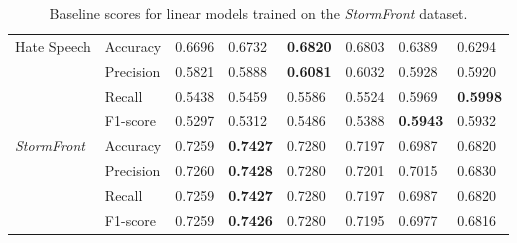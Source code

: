 \begin{table}
{\begin{tabular}{ll|ll|ll|ll}
    \multirow{4}{*}{Hate Speech}          & Accuracy  & 0.6696      & 0.6732        & \bf{0.6820} & 0.6803      & 0.6389      & 0.6294      \\
                                          & Precision & 0.5821      & 0.5888        & \bf{0.6081} & 0.6032      & 0.5928      & 0.5920      \\
                                          & Recall    & 0.5438      & 0.5459        & 0.5586      & 0.5524      & 0.5969      & \bf{0.5998} \\
                                          & F1-score  & 0.5297      & 0.5312        & 0.5486      & 0.5388      & \bf{0.5943} & 0.5932      \\\hline
    \multirow{4}{*}{\textit{StormFront}}  & Accuracy  & 0.7259      & \bf{0.7427}   & 0.7280      & 0.7197      & 0.6987      & 0.6820      \\
                                          & Precision & 0.7260      & \bf{0.7428}   & 0.7280      & 0.7201      & 0.7015      & 0.6830      \\
                                          & Recall    & 0.7259      & \bf{0.7427}   & 0.7280      & 0.7197      & 0.6987      & 0.6820      \\
                                          & F1-score  & 0.7259      & \bf{0.7426}   & 0.7280      & 0.7195      & 0.6977      & 0.6816
    \end{tabular}%
    }
    \caption{Baseline scores for linear models trained on the \textit{StormFront} dataset.}
    \label{tab:linear_stormfront_baselines}
\end{table}



